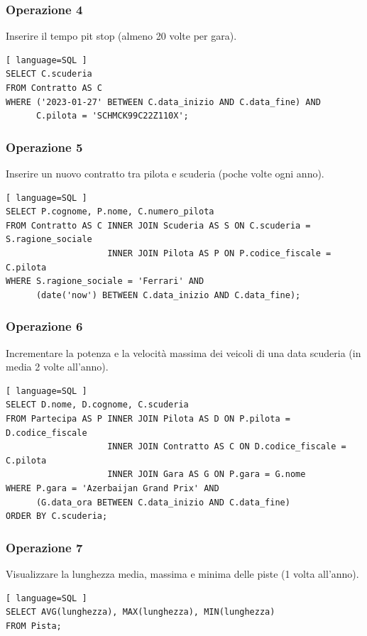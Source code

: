 \documentclass[11pt]{article}
\begin{document}
\subsubsection{Operazione 4}
Inserire il tempo pit stop (almeno 20 volte per gara).
\begin{lstlisting}[ language=SQL ]
SELECT C.scuderia
FROM Contratto AS C
WHERE ('2023-01-27' BETWEEN C.data_inizio AND C.data_fine) AND
      C.pilota = 'SCHMCK99C22Z110X';
\end{lstlisting}


\subsubsection{Operazione 5}
Inserire un nuovo contratto tra pilota e scuderia (poche volte ogni anno).
\begin{lstlisting}[ language=SQL ]
SELECT P.cognome, P.nome, C.numero_pilota
FROM Contratto AS C INNER JOIN Scuderia AS S ON C.scuderia = S.ragione_sociale 
                    INNER JOIN Pilota AS P ON P.codice_fiscale = C.pilota
WHERE S.ragione_sociale = 'Ferrari' AND
      (date('now') BETWEEN C.data_inizio AND C.data_fine);
\end{lstlisting}


\subsubsection{Operazione 6}
Incrementare la potenza e la velocità massima dei veicoli di una data scuderia (in media 2 volte all'anno).
\begin{lstlisting}[ language=SQL ]
SELECT D.nome, D.cognome, C.scuderia
FROM Partecipa AS P INNER JOIN Pilota AS D ON P.pilota = D.codice_fiscale
                    INNER JOIN Contratto AS C ON D.codice_fiscale = C.pilota
                    INNER JOIN Gara AS G ON P.gara = G.nome
WHERE P.gara = 'Azerbaijan Grand Prix' AND
      (G.data_ora BETWEEN C.data_inizio AND C.data_fine)
ORDER BY C.scuderia;    
\end{lstlisting}


\subsubsection{Operazione 7}
Visualizzare la lunghezza media, massima e minima delle piste (1 volta all'anno).
\begin{lstlisting}[ language=SQL ]
SELECT AVG(lunghezza), MAX(lunghezza), MIN(lunghezza)
FROM Pista;
\end{lstlisting}
\end{document}
